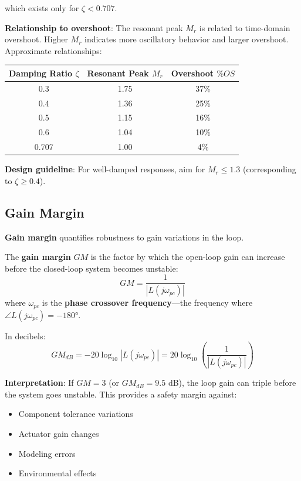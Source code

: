 which exists only for $\zeta < 0.707$.

\textbf{Relationship to overshoot}: The resonant peak $M_r$ is related to time-domain overshoot. Higher $M_r$ indicates more oscillatory behavior and larger overshoot. Approximate relationships:
\begin{center}
\begin{tabular}{ccc}
\toprule
Damping Ratio $\zeta$ & Resonant Peak $M_r$ & Overshoot $\%OS$ \\
\midrule
0.3 & 1.75 & 37\% \\
0.4 & 1.36 & 25\% \\
0.5 & 1.15 & 16\% \\
0.6 & 1.04 & 10\% \\
0.707 & 1.00 & 4\% \\
\bottomrule
\end{tabular}
\end{center}

\textbf{Design guideline}: For well-damped responses, aim for $M_r \leq 1.3$ (corresponding to $\zeta \geq 0.4$).

\subsection{Gain Margin}
\label{subsec:gain_margin}

\textbf{Gain margin} quantifies robustness to gain variations in the loop.

\begin{definition}
The \textbf{gain margin} $GM$ is the factor by which the open-loop gain can increase before the closed-loop system becomes unstable:
\begin{equation}
    GM = \frac{1}{|L(j\omega_{pc})|}
\end{equation}
where $\omega_{pc}$ is the \textbf{phase crossover frequency}---the frequency where $\angle L(j\omega_{pc}) = -180°$.
\end{definition}

In decibels:
\begin{equation}
    GM_{dB} = -20\log_{10}|L(j\omega_{pc})| = 20\log_{10}\left(\frac{1}{|L(j\omega_{pc})|}\right)
\end{equation}

\textbf{Interpretation}: If $GM = 3$ (or $GM_{dB} = 9.5$ dB), the loop gain can triple before the system goes unstable. This provides a safety margin against:
\begin{itemize}
    \item Component tolerance variations
    \item Actuator gain changes
    \item Modeling errors
    \item Environmental effects
\end{itemize}

